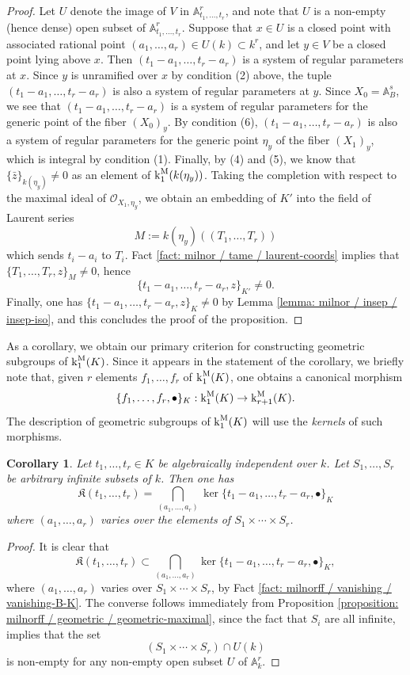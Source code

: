 \documentclass[11pt]{amsart}
\newtheorem{corollary}[proposition]{Corollary}
\theoremstyle{definition}
\theoremstyle{remark}
\numberwithin{equation}{section}
\newcommand{\Abb}{\mathbb{A}}
\newcommand{\Oc}{\mathcal{O}}
\newcommand{\Kfrak}{\mathfrak{K}}
\renewcommand{\k}{\operatorname{k}^{\rm M}}
\begin{document}
\begin{proof}
  Let $U$ denote the image of $V$ in $\Abb^r_{t_1,\ldots,t_r}$, and note that $U$ is a non-empty (hence dense) open subset of $\Abb^r_{t_1,\ldots,t_r}$.
  Suppose that $x \in U$ is a closed point with associated rational point $(a_1,\ldots,a_r) \in U(k) \subset k^r$, and let $y \in V$ be a closed point lying above $x$.
  Then $(t_1-a_1,\ldots,t_r-a_r)$ is a system of regular parameters at $x$.
  Since $y$ is unramified over $x$ by condition (2) above, the tuple $(t_1-a_1,\ldots,t_r-a_r)$ is also a system of regular parameters at $y$.
  Since $X_0 = \Abb^s_B$, we see that $(t_1-a_1,\ldots,t_r-a_r)$ is a system of regular parameters for the generic point of the fiber $(X_0)_y$.
  By condition (6), $(t_1-a_1,\ldots,t_r-a_r)$ is also a system of regular parameters for the generic point $\eta_y$ of the fiber $(X_1)_y$, which is integral by condition (1).
  Finally, by (4) and (5), we know that $\{\bar z\}_{k(\eta_y)} \neq 0$ as an element of $\k_1(k(\eta_y))$.
  Taking the completion with respect to the maximal ideal of $\Oc_{X_1,\eta_y}$, we obtain an embedding of $K'$ into the field of Laurent series
  \[ M := k(\eta_y)((T_1,\ldots,T_r)) \]
  which sends $t_i-a_i$ to $T_i$.
  Fact \ref{fact: milnor / tame / laurent-coords} implies that $\{T_1,\ldots,T_r,z\}_M \neq 0$, hence
  \[ \{t_1-a_1,\ldots,t_r-a_r,z\}_{K'} \neq 0.\]
  Finally, one has $\{t_1-a_1,\ldots,t_r-a_r,z\}_K \neq 0$ by Lemma \ref{lemma: milnor / insep / insep-iso}, and this concludes the proof of the proposition.
\end{proof}

As a corollary, we obtain our primary criterion for constructing geometric subgroups of $\k_1(K)$.
Since it appears in the statement of the corollary, we briefly note that, given $r$ elements $f_1,\ldots,f_r$ of $\k_1(K)$, one obtains a canonical morphism
\[ \{f_1,\ldots,f_r,\bullet\}_K : \k_1(K) \rightarrow \k_{r+1}(K). \]
The description of geometric subgroups of $\k_1(K)$ will use the \emph{kernels} of such morphisms.

\begin{corollary}
\label{corollary: milnorff / geometric / infinite-subsets}
  Let $t_1,\ldots,t_r \in K$ be algebraically independent over $k$.
  Let $S_1,\ldots,S_r$ be arbitrary infinite subsets of $k$.
  Then one has
  \[ \Kfrak(t_1,\ldots,t_r) = \bigcap_{(a_1,\ldots,a_r)} \ker\{t_1-a_1,\ldots,t_r-a_r,\bullet\}_K \]
  where $(a_1,\ldots,a_r)$ varies over the elements of $S_1 \times \cdots \times S_r$.
\end{corollary}
\begin{proof}
  It is clear that
  \[ \Kfrak(t_1,\ldots,t_r) \subset \bigcap_{(a_1,\ldots,a_r)} \ker\{t_1-a_1,\ldots,t_r-a_r,\bullet\}_K, \]
  where $(a_1,\ldots,a_r)$ varies over $S_1 \times \cdots \times S_r$, by Fact \ref{fact: milnorff / vanishing / vanishing-B-K}.
  The converse follows immediately from Proposition \ref{proposition: milnorff / geometric / geometric-maximal}, since the fact that $S_i$ are all infinite, implies that the set
  \[ (S_1 \times \cdots \times S_r) \cap U(k) \]
  is non-empty for any non-empty open subset $U$ of $\Abb^r_k$.
\end{proof}
\end{document}
